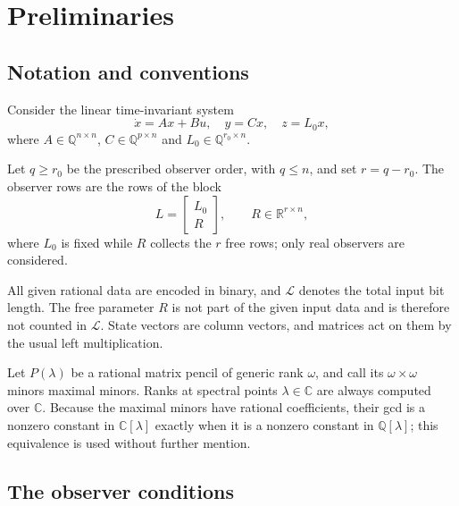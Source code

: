 \documentclass[journal]{IEEEtran}
\theoremstyle{plainn}
\theoremstyle{remark}
\begin{document}
\section{Preliminaries}\label{sec:prelim}

\subsection{Notation and conventions}\label{sec:notation}

Consider the linear time-invariant system
\begin{equation}\label{system}
\dot{x}=Ax+Bu,\quad y=Cx,\quad z=L_0x,
\end{equation}
where $A\in\mathbb Q^{n\times n}$, $C\in\mathbb Q^{p\times n}$ and
$L_0\in\mathbb Q^{r_0\times n}$.

Let $q\ge r_0$ be the prescribed observer order, with $q\le n$, and set $r=q-r_0$. The
observer rows are the rows of the block
\begin{equation*}
L=\begin{bmatrix}L_0\\R\end{bmatrix},\qquad R\in\mathbb R^{r\times n},
\end{equation*}
where $L_0$ is fixed while $R$ collects the $r$ free rows; only real observers are
considered.

All given rational data are encoded in binary, and $\mathcal L$ denotes the total input
bit length. The free parameter $R$ is not part of the given input data and is therefore
not counted in $\mathcal L$. State vectors are column vectors, and matrices act on them by
the usual left multiplication.

Let $P(\lambda)$ be a rational matrix pencil of generic rank $\omega$, and call its
$\omega\times\omega$ minors maximal minors. Ranks at spectral points $\lambda\in\mathbb C$
are always computed over $\mathbb C$. Because the maximal minors have rational
coefficients, their gcd is a nonzero constant in $\mathbb C[\lambda]$ exactly when it is a
nonzero constant in $\mathbb Q[\lambda]$; this equivalence is used without further
mention.

\subsection{The observer conditions}\label{sec:conditions}
\end{document}
